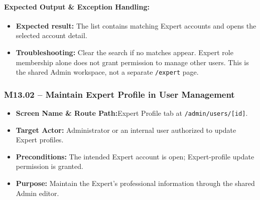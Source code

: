 \paragraph{Expected Output \& Exception Handling:}
\begin{itemize}[leftmargin=1.5em,itemsep=2pt]
  \item \textbf{Expected result:} The list contains matching Expert accounts and opens the selected account detail.
  \item \textbf{Troubleshooting:} Clear the search if no matches appear. Expert role membership alone does not grant permission to manage other users. This is the shared Admin workspace, not a separate \texttt{/expert} page.
\end{itemize}

\newpage
\subsubsection{M13.02 -- Maintain Expert Profile in User Management}
\begin{itemize}[leftmargin=1.5em,itemsep=2pt]
  \item \textbf{Screen Name \& Route Path:}\newline Expert Profile tab at \texttt{/admin/users/[id]}.
  \item \textbf{Target Actor:} Administrator or an internal user authorized to update Expert profiles.
  \item \textbf{Preconditions:} The intended Expert account is open; Expert-profile update permission is granted.
  \item \textbf{Purpose:} Maintain the Expert's professional information through the shared Admin editor.
\end{itemize}
